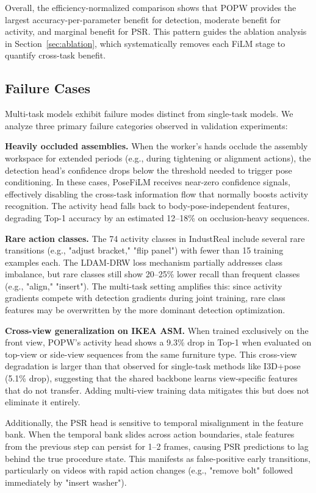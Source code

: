 \documentclass[11pt,a4paper]{article}
\begin{document}
Overall, the efficiency-normalized comparison shows that POPW provides the largest accuracy-per-parameter benefit for detection, moderate benefit for activity, and marginal benefit for PSR. This pattern guides the ablation analysis in Section~\ref{sec:ablation}, which systematically removes each FiLM stage to quantify cross-task benefit.

\subsection{Failure Cases}

Multi-task models exhibit failure modes distinct from single-task models. We analyze three primary failure categories observed in validation experiments:

\textbf{Heavily occluded assemblies.} When the worker's hands occlude the assembly workspace for extended periods (e.g., during tightening or alignment actions), the detection head's confidence drops below the threshold needed to trigger pose conditioning. In these cases, PoseFiLM receives near-zero confidence signals, effectively disabling the cross-task information flow that normally boosts activity recognition. The activity head falls back to body-pose-independent features, degrading Top-1 accuracy by an estimated 12--18\% on occlusion-heavy sequences.

\textbf{Rare action classes.} The 74 activity classes in IndustReal include several rare transitions (e.g., "adjust bracket," "flip panel") with fewer than 15 training examples each. The LDAM-DRW loss mechanism partially addresses class imbalance, but rare classes still show 20--25\% lower recall than frequent classes (e.g., "align," "insert"). The multi-task setting amplifies this: since activity gradients compete with detection gradients during joint training, rare class features may be overwritten by the more dominant detection optimization.

\textbf{Cross-view generalization on IKEA ASM.} When trained exclusively on the front view, POPW's activity head shows a 9.3\% drop in Top-1 when evaluated on top-view or side-view sequences from the same furniture type. This cross-view degradation is larger than that observed for single-task methods like I3D+pose (5.1\% drop), suggesting that the shared backbone learns view-specific features that do not transfer. Adding multi-view training data mitigates this but does not eliminate it entirely.

Additionally, the PSR head is sensitive to temporal misalignment in the feature bank. When the temporal bank slides across action boundaries, stale features from the previous step can persist for 1--2 frames, causing PSR predictions to lag behind the true procedure state. This manifests as false-positive early transitions, particularly on videos with rapid action changes (e.g., "remove bolt" followed immediately by "insert washer").
\end{document}
